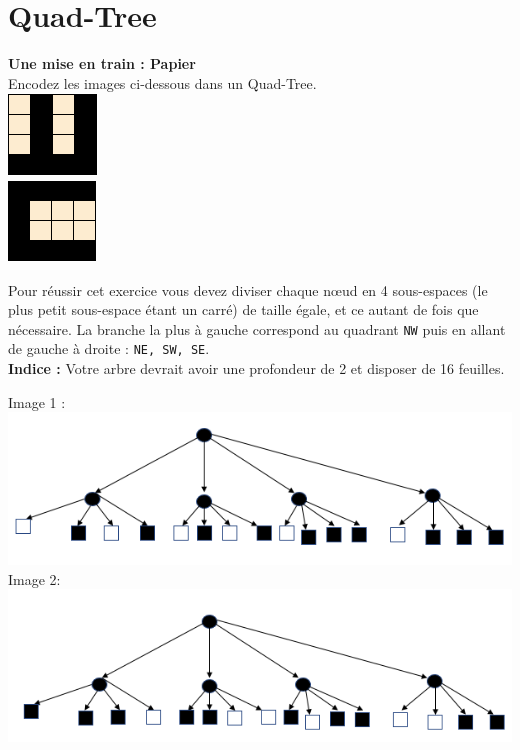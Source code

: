 \newpage

\section{ Quad-Tree}
\begin{Exercice}[10 minutes]\textbf{Une mise en train : Papier}\\

Encodez les images ci-dessous dans un Quad-Tree.\\

\includegraphics[]{resources/Quad-Tree 1.PNG}\\
\includegraphics[]{resources/Quad-Tree 2.PNG}

\begin{conseil}
   Pour réussir cet exercice vous devez diviser chaque nœud en 4 sous-espaces (le plus petit sous-espace étant un carré) de taille égale, et ce autant de fois que nécessaire. La branche la plus à gauche correspond au quadrant \lstinline{NW} puis en allant de gauche à droite : \lstinline{NE, SW, SE}. \\
    
    \textbf{Indice :} Votre arbre devrait avoir une profondeur de 2 et disposer de 16 feuilles.
\end{conseil}
\begin{solution}
Image 1 :\\
    \includegraphics[scale=0.65]{solutions/Quad-Tree 1 solution.PNG}\\
    
Image 2: \\
    \includegraphics[scale=0.65]{solutions/Quad-Tree 2 solution.PNG}
\end{solution}
\end{Exercice}
